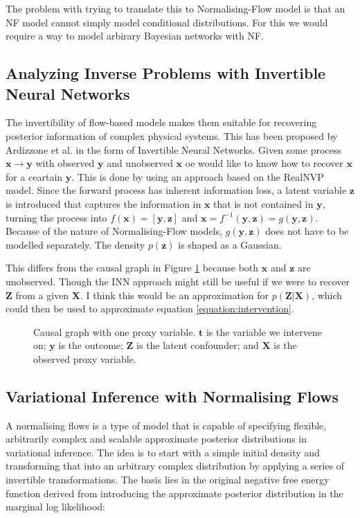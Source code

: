 \documentclass{article}
\newcommand{\bt}{\mathbf{t}}
\newcommand{\bX}{\mathbf{X}}
\newcommand{\bx}{\mathbf{x}}
\newcommand{\by}{\mathbf{y}}
\newcommand{\bZ}{\mathbf{Z}}
\newcommand{\bz}{\mathbf{z}}
\begin{document}
The problem with trying to translate this to Normalising-Flow model is that an NF model cannot simply model conditional distributions. For this we would require a way to model arbirary Bayesian networks with NF. 

\subsection*{Analyzing Inverse Problems with Invertible Neural Networks}
The invertibility of flow-based models makes them suitable for recovering posterior information of complex physical systems. This has been proposed by Ardizzone et al. \cite{ardizzone2018analyzing} in the form of Invertible Neural Networks. Given some process $\bx \rightarrow \by$ with observed $\by$ and unobserved $\bx$ oe would like to know how to recover $\bx$ for a ceartain $\by$. This is done by using an approach based on the RealNVP\cite{dinh2016density} model. Since the forward process has inherent information loss, a latent variable $\bz$ is introduced that captures the information in $\bx$ that is not contained in $\by$, turning the process into $f(\bx) = [\by, \bz]$  and $\bx = f^{-1}(\by, \bz) = g(\by, \bz)$. Because of the nature of Normalising-Flow models, $g(\by, \bz)$ does not have to be modelled separately. The density $p(\bz)$ is shaped as a Gaussian. 

This differs from the causal graph in Figure \ref{fig:causal_graph} because both $\bx$ and $\bz$ are unobserved. Though the INN approach might still be useful if we were to recover $\bZ$ from a given $\bX$. I think this would be an approximation for $p(\bZ | \bX)$, which could then be used to approximate equation \ref{equation:intervention}. 

\begin{figure}
    \centering
    
    \caption{Causal graph with one proxy variable. $\bt$ is the variable we intervene on; $\by$ is the outcome; $\bZ$ is the latent confounder; and $\bX$ is the observed proxy variable.}
    \label{fig:causal_graph}
\end{figure}


\subsection*{Variational Inference with Normalising Flows}
A normalising flows is a type of model that is capable of specifying flexible, arbitrarily complex and scalable approximate posterior distributions in variational inference\cite{rezende2016variational}. The idea is to start with a simple initial density and transforming that into an arbitrary complex distribution by applying a series of invertible transformations. The basis lies in the original negative free energy function derived from introducing the approximate posterior distribution in the marginal log likelihood:
\end{document}
